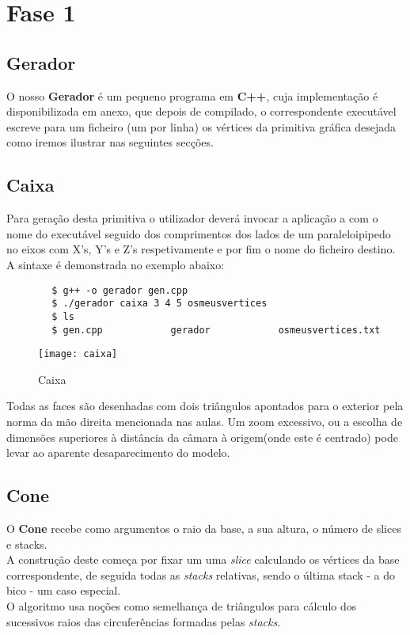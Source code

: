 \documentclass{article}
\begin{document}
\section{Fase 1}

\subsection{Gerador}
O nosso \textbf{Gerador} é um pequeno programa em \textbf{C++}, cuja implementação é disponibilizada em anexo, que depois de compilado, o correspondente executável escreve para um ficheiro (um por linha) os vértices da primitiva gráfica desejada  como iremos ilustrar nas seguintes secções.


\subsection{Caixa}
Para geração desta primitiva o utilizador deverá invocar a aplicação a com o nome do executável seguido dos comprimentos dos lados de um paraleloipipedo no eixos com X’s, Y’s e Z’s respetivamente e por fim o nome do ficheiro destino. A sintaxe é demonstrada no exemplo abaixo:

\begin{commandline}
    \begin{verbatim}
        $ g++ -o gerador gen.cpp
        $ ./gerador caixa 3 4 5 osmeusvertices
        $ ls
        $ gen.cpp            gerador            osmeusvertices.txt
    \end{verbatim}
\end{commandline}

\begin{figure}[H]
	\centering
	\texttt{[image: caixa]}
	\caption{Caixa}
\end{figure}

\begin{warn}[Notice:]
Todas as faces são desenhadas com dois triângulos apontados para o exterior pela norma da mão direita mencionada nas aulas. Um zoom excessivo, ou a escolha de dimensões superiores à distância da câmara à origem(onde este é centrado)  pode levar ao aparente desaparecimento do modelo.
\end{warn}

\subsection{Cone}
O \textbf{Cone} recebe como argumentos o raio da base, a sua altura, o número de slices e stacks. \\
A construção deste começa por fixar um uma \textit{slice} calculando os vértices da base correspondente, de seguida todas as \textit{stacks} relativas, sendo o última stack - a do bico - um caso especial. \\
O algoritmo usa noções como semelhança de triângulos para cálculo dos sucessivos raios das circuferências formadas pelas \textit{stacks}.\\
\end{document}
